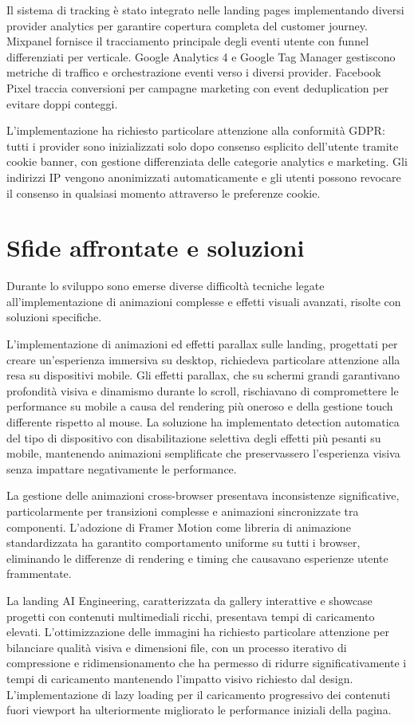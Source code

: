 Il sistema di tracking è stato integrato nelle landing pages implementando 
diversi provider analytics per garantire copertura completa del customer journey. 
Mixpanel fornisce il tracciamento principale degli eventi utente con funnel 
differenziati per verticale. Google Analytics 4 e Google Tag Manager gestiscono 
metriche di traffico e orchestrazione eventi verso i diversi provider. Facebook 
Pixel traccia conversioni per campagne marketing con event deduplication per 
evitare doppi conteggi.

L'implementazione ha richiesto particolare attenzione alla conformità GDPR: 
tutti i provider sono inizializzati solo dopo consenso esplicito dell'utente 
tramite cookie banner, con gestione differenziata delle categorie analytics 
e marketing. Gli indirizzi IP vengono anonimizzati automaticamente e gli utenti 
possono revocare il consenso in qualsiasi momento attraverso le preferenze cookie.

\section{Sfide affrontate e soluzioni}
Durante lo sviluppo sono emerse diverse difficoltà tecniche legate all'implementazione 
di animazioni complesse e effetti visuali avanzati, risolte con soluzioni specifiche.

L'implementazione di animazioni ed effetti parallax sulle landing, progettati per 
creare un'esperienza immersiva su desktop, richiedeva particolare attenzione alla 
resa su dispositivi mobile. Gli effetti parallax, che su schermi grandi garantivano 
profondità visiva e dinamismo durante lo scroll, rischiavano di compromettere le 
performance su mobile a causa del rendering più oneroso e della gestione touch 
differente rispetto al mouse. La soluzione ha implementato detection automatica 
del tipo di dispositivo con disabilitazione selettiva degli effetti più pesanti 
su mobile, mantenendo animazioni semplificate che preservassero l'esperienza visiva 
senza impattare negativamente le performance.

La gestione delle animazioni cross-browser presentava inconsistenze significative, 
particolarmente per transizioni complesse e animazioni sincronizzate tra componenti. 
L'adozione di Framer Motion come libreria di animazione standardizzata ha garantito 
comportamento uniforme su tutti i browser, eliminando le differenze di rendering 
e timing che causavano esperienze utente frammentate.

La landing AI Engineering, caratterizzata da gallery interattive e showcase 
progetti con contenuti multimediali ricchi, presentava tempi di caricamento 
elevati. L'ottimizzazione delle immagini ha richiesto particolare attenzione 
per bilanciare qualità visiva e dimensioni file, con un processo iterativo di 
compressione e ridimensionamento che ha permesso di ridurre significativamente 
i tempi di caricamento mantenendo l'impatto visivo richiesto dal design. 
L'implementazione di lazy loading per il caricamento progressivo dei contenuti 
fuori viewport ha ulteriormente migliorato le performance iniziali della pagina.

